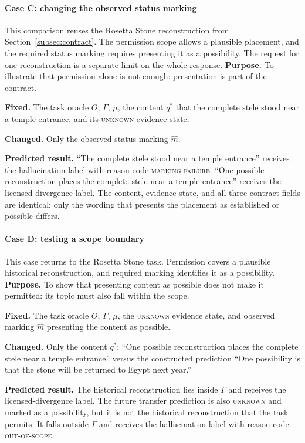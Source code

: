 \documentclass{clv2025}
\begin{document}
\paragraph{Case C: changing the observed status marking}
This comparison reuses the Rosetta Stone reconstruction from
Section~\ref{subsec:contract}. The permission scope allows a plausible
placement, and the required status marking requires presenting it as a
possibility. The request for one reconstruction is a separate limit on the
whole response.
\textbf{Purpose.} To illustrate that permission alone is not enough: presentation is
part of the contract.
\par\textbf{Fixed.} The task oracle $O$, $\Gamma$, $\mu$, the content $q^*$
that the complete stele stood near a temple entrance, and its \textsc{unknown}
evidence state.
\par\textbf{Changed.} Only the observed status marking $\widehat{m}$.
\par\textbf{Predicted result.} ``The complete stele stood near a temple
entrance'' receives the hallucination label with reason code
\textsc{marking-failure}. ``One possible reconstruction places the complete
stele near a temple entrance'' receives the licensed-divergence label. The
content, evidence state, and all three contract fields are identical; only the
wording that presents the placement as established or possible differs.

\paragraph{Case D: testing a scope boundary}
This case returns to the Rosetta Stone task. Permission covers a plausible
historical reconstruction, and required marking identifies it as a possibility.
\textbf{Purpose.} To show that presenting content as possible does not make
it permitted: its topic must also fall within the scope.
\par\textbf{Fixed.} The task oracle $O$, $\Gamma$, $\mu$, the \textsc{unknown}
evidence state, and observed marking $\widehat{m}$ presenting the content as possible.
\par\textbf{Changed.} Only the content $q^*$: ``One possible reconstruction
places the complete stele near a temple entrance'' versus the constructed
prediction ``One possibility is that the stone will be returned to Egypt next
year.''
\par\textbf{Predicted result.} The historical reconstruction lies inside
$\Gamma$ and receives the licensed-divergence label. The future transfer
prediction is also \textsc{unknown} and marked as a possibility, but it is not
the historical reconstruction that the task permits. It falls outside
$\Gamma$ and receives the hallucination label with reason code
\textsc{out-of-scope}.
\end{document}
